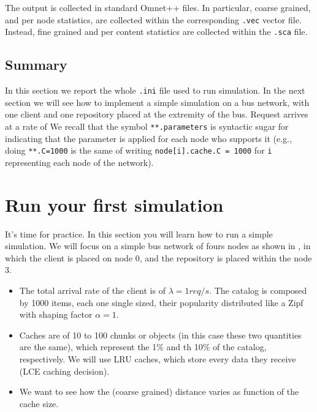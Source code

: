 \documentclass{article}
\begin{document}
The output is collected in standard Omnet++ files. In particular, coarse grained, and per node statistics, are collected within the corresponding \verb|.vec| vector file. Instead, fine grained and per content statistics are collected within the \verb|.sca| file. 


\subsection{Summary}
In this section we report the whole \verb|.ini| file used to run simulation. In the next section we will see how to implement a simple simulation on a bus network, with one client and one repository placed at the extremity of the bus. Request arrives at a rate of We recall that the symbol \verb|**.parameters| is syntactic sugar for indicating that the parameter is applied for each node who supports it (e.g., doing \verb|**.C=1000| is the same of writing \verb|node[i].cache.C = 1000| for \verb|i| representing each node of the network). 

\section{Run your first simulation}
It's time for practice. In this section you will learn how to run a simple simulation. We will focus on a simple bus network of fours nodes as shown in , in which the client is placed on node 0, and the repository is placed within the node 3.

\begin{itemize}
    \item The total arrival rate of the client is of $\lambda=1req/s$. The catalog is composed by 1000 items, each one single sized, their popularity distributed like a Zipf with shaping factor $\alpha=1$. 
    \item Caches are of 10 to 100 chunks or objects (in this case these two quantities are the same), which represent the 1\% and th 10\% of the catalog, respectively. We will use LRU caches, which store every data they receive (LCE caching decision). 
    \item We want to see how the (coarse grained) distance varies as function of the cache size. 
\end{itemize}
\end{document}
